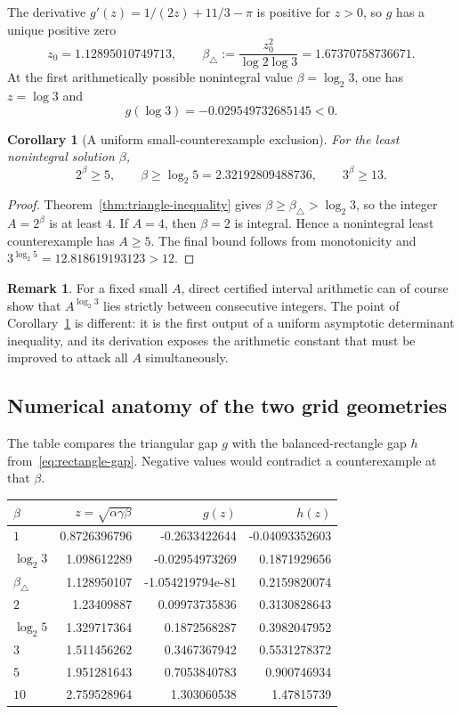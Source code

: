 \documentclass[11pt]{article}
\newtheorem{corollary}[theorem]{Corollary}
\theoremstyle{definition}
\newtheorem{remark}[theorem]{Remark}
\begin{document}
The derivative $g'(z)=1/(2z)+11/3-\pi$ is positive for $z>0$, so $g$ has a
unique positive zero
\[
 z_0=1.12895010749713,
 \qquad
 \beta_\triangle:=\frac{z_0^2}{\log2\log3}=1.67370758736671.
\]
At the first arithmetically possible nonintegral value
$\beta=\log_2 3$, one has $z=\log3$ and
\[
 g(\log3)=-0.029549732685145<0.
\]

\begin{corollary}[A uniform small-counterexample exclusion]\label{cor:A-ge-5}
For the least nonintegral solution $\beta$,
\[
 2^\beta\ge5,
 \qquad
 \beta\ge\log_2 5=2.32192809488736,
 \qquad
 3^\beta\ge13.
\]
\end{corollary}
\begin{proof}
Theorem~\ref{thm:triangle-inequality} gives
$\beta\ge\beta_\triangle>\log_2 3$, so the integer $A=2^\beta$ is at least
$4$.  If $A=4$, then $\beta=2$ is integral.  Hence a nonintegral least
counterexample has $A\ge5$.  The final bound follows from monotonicity and
$3^{\log_2 5}=12.818619193123>12$.
\end{proof}

\begin{remark}
For a fixed small $A$, direct certified interval arithmetic can of course show
that $A^{\log_2 3}$ lies strictly between consecutive integers.  The point of
Corollary~\ref{cor:A-ge-5} is different: it is the first output of a uniform
asymptotic determinant inequality, and its derivation exposes the arithmetic
constant that must be improved to attack all $A$ simultaneously.
\end{remark}

\subsection{Numerical anatomy of the two grid geometries}

The table compares the triangular gap $g$ with the balanced-rectangle gap $h$
from~\eqref{eq:rectangle-gap}.  Negative values would contradict a
counterexample at that $\beta$.

\begin{center}
\begin{tabular}{lrrr}
\toprule
$\beta$ & $z=\sqrt{\alpha\gamma\beta}$ & $g(z)$ & $h(z)$ \\
\midrule
$1$ & 0.8726396796 & -0.2633422644 & -0.04093352603 \\
$\log_2 3$ & 1.098612289 & -0.02954973269 & 0.1871929656 \\
$\beta_{\triangle}$ & 1.128950107 & -1.054219794e-81 & 0.2159820074 \\
$2$ & 1.23409887 & 0.09973735836 & 0.3130828643 \\
$\log_2 5$ & 1.329717364 & 0.1872568287 & 0.3982047952 \\
$3$ & 1.511456262 & 0.3467367942 & 0.5531278372 \\
$5$ & 1.951281643 & 0.7053840783 & 0.900746934 \\
$10$ & 2.759528964 & 1.303060538 & 1.47815739 \\
\bottomrule
\end{tabular}
\end{center}
\end{document}
